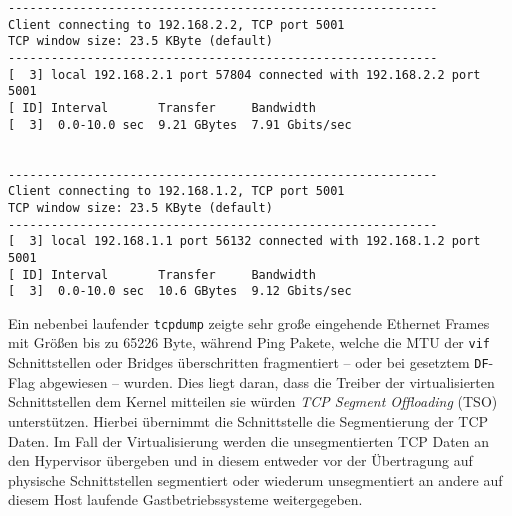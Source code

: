 \setupVerbatimOut
\begin{verbatim}
------------------------------------------------------------
Client connecting to 192.168.2.2, TCP port 5001
TCP window size: 23.5 KByte (default)
------------------------------------------------------------
[  3] local 192.168.2.1 port 57804 connected with 192.168.2.2 port 5001
[ ID] Interval       Transfer     Bandwidth
[  3]  0.0-10.0 sec  9.21 GBytes  7.91 Gbits/sec


------------------------------------------------------------
Client connecting to 192.168.1.2, TCP port 5001
TCP window size: 23.5 KByte (default)
------------------------------------------------------------
[  3] local 192.168.1.1 port 56132 connected with 192.168.1.2 port 5001
[ ID] Interval       Transfer     Bandwidth
[  3]  0.0-10.0 sec  10.6 GBytes  9.12 Gbits/sec
\end{verbatim}
Ein nebenbei laufender \verb#tcpdump# zeigte sehr große eingehende Ethernet Frames mit Größen bis zu 65226 Byte, während Ping Pakete, welche die MTU der \verb#vif# Schnittstellen oder Bridges überschritten fragmentiert -- oder bei gesetztem \verb#DF#-Flag abgewiesen -- wurden. Dies liegt daran, dass die Treiber der virtualisierten Schnittstellen dem Kernel mitteilen sie würden \emph{TCP Segment Offloading} (TSO) unterstützen. Hierbei übernimmt die Schnittstelle die Segmentierung der TCP Daten. Im Fall der Virtualisierung werden die unsegmentierten TCP Daten an den Hypervisor übergeben und in diesem entweder vor der Übertragung auf physische Schnittstellen segmentiert oder wiederum unsegmentiert an andere auf diesem Host laufende Gastbetriebssysteme weitergegeben.
\setupVerbatimOut
